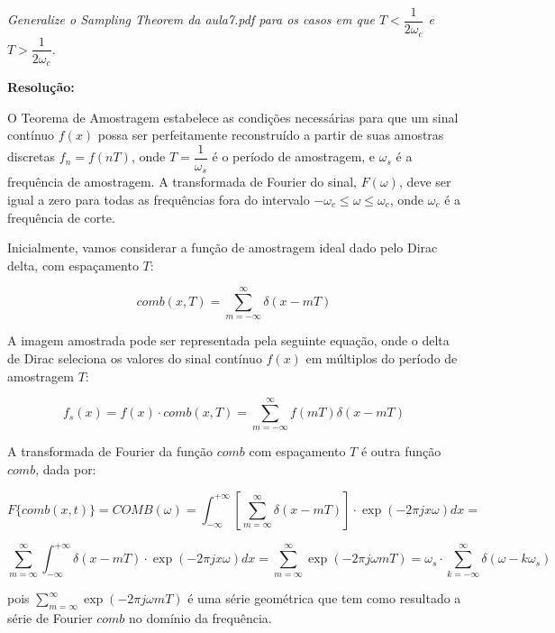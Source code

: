 \documentclass[]{abntex2}
\begin{document}
\textit{Generalize o Sampling Theorem da aula7.pdf para os casos em que $T<\dfrac{1}{2{\omega}_c}$ e $T>\dfrac{1}{2{\omega}_c}$.}

\textbf{Resolução:}

O Teorema de Amostragem estabelece as condições necessárias para que um sinal contínuo \( f(x) \) possa ser perfeitamente reconstruído a partir de suas amostras discretas \( f_n = f(nT) \), onde \( T = \dfrac{1}{\omega_s} \) é o período de amostragem, e \( \omega_s \) é a frequência de amostragem. A transformada de Fourier do sinal, \( F(\omega) \), deve ser igual a zero para todas as frequências fora do intervalo \( -\omega_c \leq \omega \leq \omega_c \), onde \( \omega_c \) é a frequência de corte.

Inicialmente, vamos considerar a função de amostragem ideal dado pelo Dirac delta, com espaçamento $T$:

\begin{equation*}
    comb(x,T) = \sum_{m=- \infty}^{\infty} \delta (x - mT)
\end{equation*}

A imagem amostrada pode ser representada pela seguinte equação, onde o delta de Dirac seleciona os valores do sinal contínuo \( f(x) \) em múltiplos do período de amostragem \( T \):

\begin{equation*}
    f_s(x) = f(x) \cdot comb(x, T) = \sum_{m=- \infty}^{\infty} f(mT) \delta (x - mT)
\end{equation*}

A transformada de Fourier da função \( comb \) com espaçamento \( T \) é outra função \( comb \), dada por:

\begin{equation*}
    F\{comb(x,t)\} = COMB(\omega) = \int_{-\infty}^{+\infty} [\sum_{m=\infty}^{\infty} \delta (x - mT) ]\cdot \exp(-2\pi j x \omega)dx = 
\end{equation*}

\begin{equation*}
	\sum_{m=\infty}^{\infty} \int_{-\infty}^{+\infty} \delta (x - mT) \cdot \exp(-2\pi j x \omega)dx = \sum_{m=\infty}^{\infty} \exp(-2\pi j\omega mT) =\omega_{s} \cdot \sum_{k=- \infty}^{\infty} \delta (\omega - k\omega_{s})
\end{equation*}

pois $\sum_{m=\infty}^{\infty} \exp(-2\pi j\omega mT)$ é uma série geométrica que tem como resultado a série de Fourier $comb$ no domínio da frequência.
\end{document}
